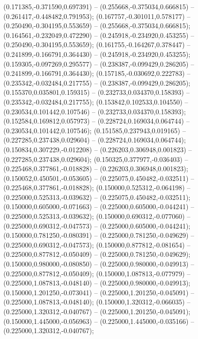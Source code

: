  (0.171385,-0.371590,0.697391) -- (0.255668,-0.375034,0.666815) -- (0.261417,-0.448482,0.791953);
 (0.167757,-0.301011,0.578177) -- (0.250490,-0.304195,0.553659) -- (0.255668,-0.375034,0.666815);
 (0.164561,-0.232049,0.472290) -- (0.245918,-0.234920,0.453255) -- (0.250490,-0.304195,0.553659);
 (0.161755,-0.164267,0.378447) -- (0.241899,-0.166791,0.364430) -- (0.245918,-0.234920,0.453255);
 (0.159305,-0.097269,0.295577) -- (0.238387,-0.099429,0.286205) -- (0.241899,-0.166791,0.364430);
 (0.157185,-0.030692,0.222783) -- (0.235342,-0.032484,0.217755) -- (0.238387,-0.099429,0.286205);
 (0.155370,0.035801,0.159315) -- (0.232733,0.034370,0.158393) -- (0.235342,-0.032484,0.217755);
 (0.153842,0.102533,0.104550) -- (0.230534,0.101442,0.107546) -- (0.232733,0.034370,0.158393);
 (0.152584,0.169812,0.057973) -- (0.228724,0.169034,0.064744) -- (0.230534,0.101442,0.107546);
 (0.151585,0.237943,0.019165) -- (0.227285,0.237438,0.029604) -- (0.228724,0.169034,0.064744);
 (0.150834,0.307229,-0.012208) -- (0.226203,0.306948,0.001823) -- (0.227285,0.237438,0.029604);
 (0.150325,0.377977,-0.036403) -- (0.225468,0.377861,-0.018828) -- (0.226203,0.306948,0.001823);
 (0.150052,0.450501,-0.053605) -- (0.225075,0.450482,-0.032511) -- (0.225468,0.377861,-0.018828);
 (0.150000,0.525312,-0.064198) -- (0.225000,0.525313,-0.039632) -- (0.225075,0.450482,-0.032511);
 (0.150000,0.605000,-0.071663) -- (0.225000,0.605000,-0.044241) -- (0.225000,0.525313,-0.039632);
 (0.150000,0.690312,-0.077060) -- (0.225000,0.690312,-0.047573) -- (0.225000,0.605000,-0.044241);
 (0.150000,0.781250,-0.080391) -- (0.225000,0.781250,-0.049629) -- (0.225000,0.690312,-0.047573);
 (0.150000,0.877812,-0.081654) -- (0.225000,0.877812,-0.050409) -- (0.225000,0.781250,-0.049629);
 (0.150000,0.980000,-0.080850) -- (0.225000,0.980000,-0.049913) -- (0.225000,0.877812,-0.050409);
 (0.150000,1.087813,-0.077979) -- (0.225000,1.087813,-0.048140) -- (0.225000,0.980000,-0.049913);
 (0.150000,1.201250,-0.073041) -- (0.225000,1.201250,-0.045091) -- (0.225000,1.087813,-0.048140);
 (0.150000,1.320312,-0.066035) -- (0.225000,1.320312,-0.040767) -- (0.225000,1.201250,-0.045091);
 (0.150000,1.445000,-0.056963) -- (0.225000,1.445000,-0.035166) -- (0.225000,1.320312,-0.040767);
